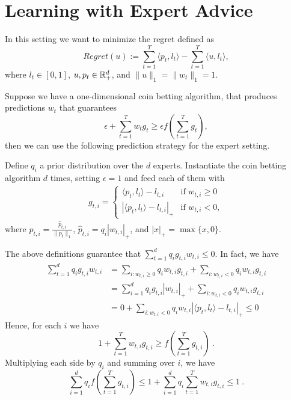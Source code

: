 \section{Learning with Expert Advice}

In this setting we want to minimize the regret defined as
\[
Regret(u):=\sum_{t=1}^T \langle p_t, l_t \rangle - \sum_{t=1}^T \langle u, l_t \rangle,
\]
where $l_t \in [0,1]$, $u, p_t \in \mathbb{R}^d_+$, and $\|u\|_1=\|w_t\|_1=1$.

Suppose we have a one-dimensional coin betting algorithm, that produces predictions $w_t$ that guarantees
\[
\epsilon + \sum_{t=1}^T w_t g_t \geq \epsilon f(\sum_{t=1}^T g_t),
\]
then we can use the following prediction strategy for the expert setting.

Define $q_i$ a prior distribution over the $d$ experts.
Instantiate the coin betting algorithm $d$ times, setting $\epsilon =1$ and feed each of them with
\begin{align}
g_{t,i} = \begin{cases}
\langle p_t, l_t\rangle - l_{t,i} & \text{if } w_{t,i} \geq 0 \\
|\langle p_t, l_t\rangle - l_{t,i}|_+ & \text{if } w_{t,i} < 0,
\end{cases}
\end{align}
where $p_{t,i} = \frac{\hat{p}_{t,i}}{\|p_{t}\|_1}$, $\hat{p}_{t,i}=q_i |w_{t,i}|_+$, and $|x|_+=\max\{x,0\}$.

The above definitions guarantee that $\sum_{t=1}^d q_i g_{t,i} w_{t,i} \leq 0$. In fact, we have
\begin{align*}
\sum_{t=1}^d q_i g_{t,i} w_{t,i}
&= \sum_{i:w_{t,i}\geq0} q_i w_{t,i} g_{t,i} + \sum_{i:w_{t,i}<0} q_i w_{t,i} g_{t,i} \\
&= \sum_{i=1}^d q_i g_{t,i} |w_{t,i}|_+ + \sum_{i:w_{t,i}<0} q_i w_{t,i} g_{t,i} \\
&= 0 + \sum_{i:w_{t,i}<0} q_i w_{t,i} |\langle p_t, l_t\rangle - l_{t,i}|_+ \leq 0
\end{align*}
Hence, for each $i$ we have
\[
1+\sum_{t=1}^T w_{t,i} g_{t,i} \geq f(\sum_{t=1}^T g_{t,i})~.
\]
Multiplying each side by $q_i$ and summing over $i$, we have
\begin{equation}
\label{eq:bounded_potential}
\sum_{i=1}^d q_i f(\sum_{t=1}^T g_{t,i}) \leq 1 + \sum_{i=1}^d q_i \sum_{t=1}^T w_{t,i} g_{t,i} \leq 1~.
\end{equation}

